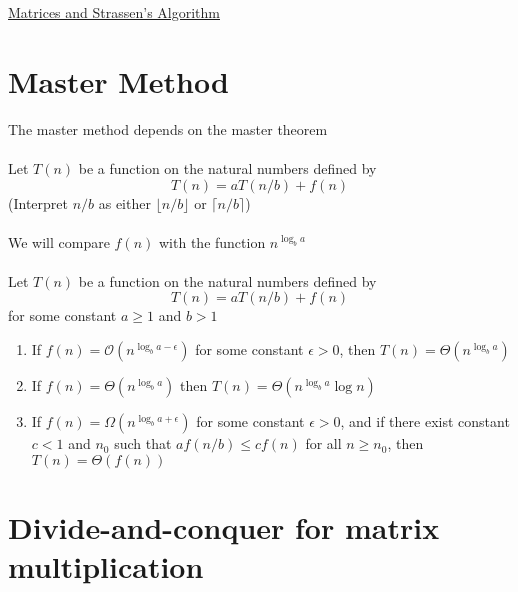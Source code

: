 \documentclass{article}[18pt]
\begin{document}
\begin{center}
\underline{\huge Matrices and Strassen's Algorithm}
\end{center}
\section{Master Method}
The master method depends on the master theorem\\
\\
Let $T(n)$ be a function on the natural numbers defined by
$$T(n)=aT(n/b)+f(n)$$
(Interpret $n/b$ as either $\lfloor n/b \rfloor$ or $\lceil n/b \rceil$)\\
\\
We will compare $f(n)$ with the function $n^{\log_ba}$\\
\\
Let $T(n)$ be a function on the natural numbers defined by
$$T(n)=aT(n/b)+f(n)$$
for some constant $a\geqslant 1$ and $b>1$
\begin{enumerate}
	\item If $f(n)=\mathcal{O}(n^{\log_ba-\epsilon})$ for some constant $\epsilon>0$, then $T(n)=\Theta(n^{\log_ba})$
	\item If $f(n)=\Theta(n^{\log_ba})$ then $T(n)=\Theta(n^{\log_ba}\log n)$
	\item If $f(n)=\Omega(n^{\log_ba+\epsilon})$ for some constant $\epsilon>0$, and if there exist constant $c<1$ and $n_0$ such that $af(n/b)\leqslant cf(n)$ for all $n\geqslant n_0$, then $T(n)=\Theta(f(n))$
\end{enumerate}
\section{Divide-and-conquer for matrix multiplication}
\end{document}

